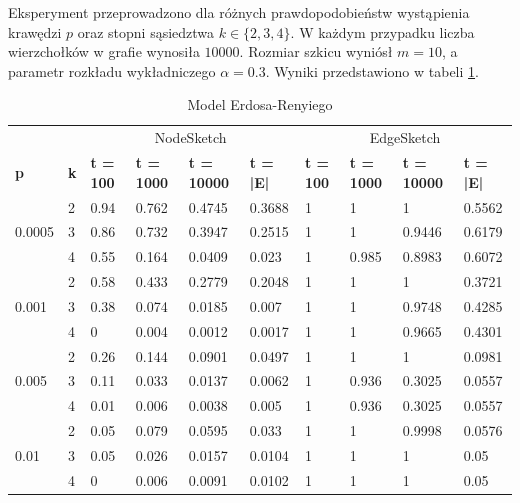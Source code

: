         Eksperyment przeprowadzono dla różnych prawdopodobieństw wystąpienia krawędzi $p$ oraz stopni sąsiedztwa $k \in \{2,3,4\}$. W każdym przypadku liczba wierzchołków w grafie wynosiła $10000$. Rozmiar szkicu wyniósł $m = 10$, a parametr rozkładu wykładniczego $\alpha = 0.3$. Wyniki przedstawiono w tabeli \ref{tab:erdos_renyi}.

        \begin{table}[!ht]
        \small
            \centering
            \begin{tabular}{|l|l|l|l|l|l|l|l|l|l|}
            \hline
                & & \multicolumn{4}{c|}{NodeSketch} & \multicolumn{4}{c|}{EdgeSketch} \\ \cline{1-10}
                \textbf{p} & \textbf{k} & \textbf{t = 100} & \textbf{t = 1000} & \textbf{t = 10000} & \textbf{t = |E|} & \textbf{t = 100} & \textbf{t = 1000} & \textbf{t = 10000} & \textbf{t = |E|} \\ \hline\hline
                \multirow{3}{*}{0.0005} & 2 & 0.94 & 0.762 & 0.4745 & 0.3688 & 1	& 1	& 1	& 0.5562 \\ \cline{2-10}
                & 3 & 0.86 & 0.732 & 0.3947 & 0.2515	& 1	& 1	& 0.9446 &	0.6179 \\ \cline{2-10}
                & 4 & 0.55 & 0.164 & 0.0409 & 0.023	& 1	& 0.985 & 0.8983 & 0.6072 \\ \hline\hline
                \multirow{3}{*}{0.001} & 2 & 0.58 & 0.433 & 0.2779 & 0.2048	& 1	& 1	& 1	& 0.3721 \\ \cline{2-10}
                & 3 & 0.38 & 0.074 & 0.0185 & 0.007	& 1	& 1	& 0.9748 & 0.4285 \\ \cline{2-10}
                & 4 & 0 & 0.004 & 0.0012 & 0.0017 & 1 & 1 & 0.9665 & 0.4301 \\ \hline\hline
                \multirow{3}{*}{0.005} & 2 & 0.26 & 0.144 & 0.0901 & 0.0497	& 1	& 1	& 1	& 0.0981 \\ \cline{2-10}
                & 3 & 0.11 & 0.033	& 0.0137 & 0.0062 & 1 & 0.936 & 0.3025 & 0.0557 \\ \cline{2-10}
                & 4 & 0.01 & 0.006 & 0.0038 & 0.005	& 1	& 0.936	& 0.3025 & 0.0557 \\ \hline\hline
                \multirow{3}{*}{0.01} & 2 & 0.05 & 0.079 & 0.0595 & 0.033	& 1	& 1	& 0.9998 & 0.0576 \\ \cline{2-10}
                & 3 & 0.05 & 0.026 & 0.0157 & 0.0104	& 1	& 1	& 1	& 0.05 \\ \cline{2-10}
                & 4 & 0 & 0.006 & 0.0091 & 0.0102	& 1	& 1	& 1	& 0.05 \\ \hline
            \end{tabular}
            \caption{Model Erdosa-Renyiego}
            \label{tab:erdos_renyi}

        \end{table}


